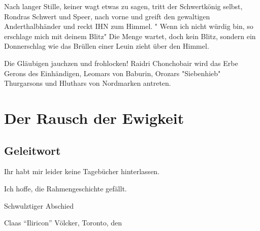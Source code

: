 Nach langer Stille, keiner wagt etwas zu sagen, tritt der Schwertkönig selbst, Rondras Schwert und Speer, nach vorne und greift den gewaltigen Anderthalbhänder und reckt IHN zum Himmel. " Wenn ich nicht würdig bin, so erschlage mich mit deinem Blitz" Die Menge wartet, doch kein Blitz, sondern ein Donnerschlag wie das Brüllen einer Leuin zieht über den Himmel.

Die Gläubigen jauchzen und frohlocken!
Raidri Chonchobair wird das Erbe Gerons des Einhändigen, Leomars von Baburin, Orozars "Siebenhieb" Thurgarsons und Hluthars von Nordmarken antreten.

\chapter{Der Rausch der Ewigkeit}

\section{Geleitwort}
Ihr habt mir leider keine Tagebücher hinterlassen.

Ich hoffe, die Rahmengeschichte gefällt.

Schwulztiger Abschied

\begin{flushright}
Claas ``Iliricon'' Völcker, Toronto, den 
\end{flushright}



